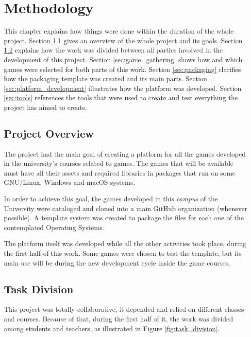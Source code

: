 \chapter{Methodology}
\label{sec:methodology}

This chapter explains how things were done within the duration of the whole project. Section \ref{sec:project_overview} gives an overview of the whole project and its goals. Section \ref{sec:task_division} explains how the work was divided between all parties involved in the development of this project. Section \ref{sec:game_gathering} shows how and which games were selected for both parts of this work. Section \ref{sec:packaging} clarifies how the packaging template was created and its main parts. Section \ref{sec:platform_development} illustrates how the platform was developed. Section \ref{sec:tools} references the tools that were used to create and test everything the project has aimed to create.

\section{Project Overview}
\label{sec:project_overview}

The project had the main goal of creating a platform for all the games developed in the university's courses related to games. The games that will be available must have all their assets and required libraries in packages that run on some GNU/Linux, Windows and macOS systems.

In order to achieve this goal, the games developed in this \textit{campus} of the University were cataloged and cloned into a main GitHub organization \footnotemark (whenever possible). A template system was created to package the files for each one of the contemplated Operating Systems.

The platform itself was developed while all the other activities took place, during the first half of this work. Some games were chosen to test the template, but its main use will be during the new development cycle inside the game courses.


\section{Task Division}
\label{sec:task_division}

This project was totally collaborative, it depended and relied on different classes and courses. Because of that, during the first half of it, the work was divided among students and teachers, as illustrated in Figure \ref{fig:task_division}.

